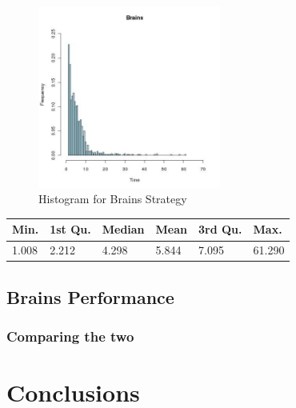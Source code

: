 \documentclass[letterpaper]{article}
\begin{document}
\begin{figure}[h]
    \centering
    \includegraphics[width=60mm]{./brains_stats.jpg}
    \caption{Histogram for Brains Strategy}
    \label{fig:brains-strategy}
\end{figure}

\begin{tabular}{|l|l|l|l|l|l|}
\hline
Min. & 1st Qu.  & Median & Mean & 3rd Qu. & Max.\\
\hline
1.008 & 2.212 & 4.298 & 5.844 & 7.095 & 61.290\\
\hline
\end{tabular}

\subsection{Brains Performance}

\subsubsection{Comparing the two}

\section{Conclusions}
\end{document}
